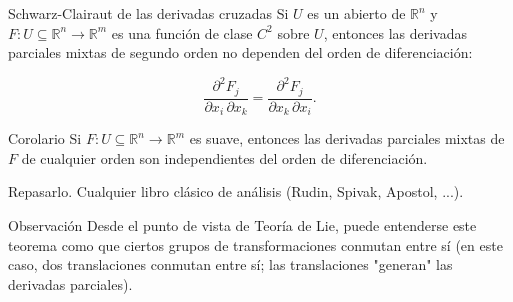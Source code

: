 \begin{booktheorem}{Schwarz-Clairaut de las derivadas cruzadas}
Si $U$ es un abierto de $\mathbb{R}^n$ y $F:U\subseteq \mathbb{R}^n\to \mathbb{R}^m$ es una función de clase $C^2$ sobre $U$, entonces las derivadas parciales mixtas de segundo orden no dependen del orden de diferenciación:

\[
\frac{\partial^2 F_j}{\partial x_i\,\partial x_k}
=
\frac{\partial^2 F_j}{\partial x_k\,\partial x_i}.
\]
\end{booktheorem}
\begin{bookcorollary}{Corolario}
Si $F:U\subseteq \mathbb{R}^n\to \mathbb{R}^m$ es suave, entonces las derivadas parciales mixtas de $F$ de cualquier orden son independientes del orden de diferenciación.

\end{bookcorollary}
\begin{bookproof}{}
Repasarlo. Cualquier libro clásico de análisis (Rudin, Spivak, Apostol, ...).

\bookqed
\end{bookproof}
\begin{bookremark}{Observación}
Desde el punto de vista de Teoría de Lie, puede entenderse este teorema como que ciertos grupos de transformaciones conmutan entre sí (en este caso, dos translaciones conmutan entre sí; las translaciones "generan" las derivadas parciales).

\end{bookremark}
